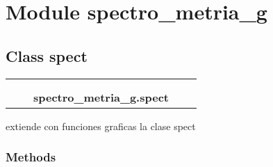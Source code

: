 %
%
%


\section{Module spectro\_metria\_g}

    \label{spectro_metria_g}


\subsection{Class spect}

    \label{spectro_metria_g:spect}
\begin{tabular}{cccccc}
\multicolumn{2}{r}{\settowidth{\BCL}{spectro\_metria.spect}\multirow{2}{\BCL}{spectro\_metria.spect}}
&&
  \\\cline{3-3}
  &&\multicolumn{1}{c|}{}
&&
  \\
&&\multicolumn{2}{l}{\textbf{spectro\_metria\_g.spect}}
\end{tabular}

extiende con funciones graficas la clase spect



  \subsubsection{Methods}

    \vspace{0.5ex}

